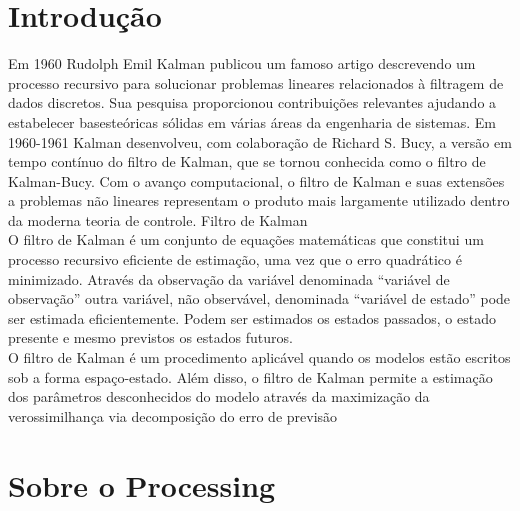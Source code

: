 \documentclass[11pt,a4paper]{article}
\begin{document}
\section{Introdução}
Em  1960  Rudolph  Emil  Kalman  publicou  um  famoso  artigo  descrevendo  um processo recursivo para solucionar problemas lineares relacionados à filtragem de dados discretos. Sua pesquisa proporcionou contribuições relevantes ajudando a estabelecer basesteóricas sólidas em várias áreas da engenharia de sistemas. Em 1960-1961  Kalman  desenvolveu,  com  colaboração de  Richard  S.  Bucy,  a  versão  em tempo contínuo do filtro de Kalman, que se tornou conhecida como o filtro de Kalman-Bucy. Com o avanço computacional, o filtro de Kalman e suas extensões a problemas não lineares representam o produto mais largamente utilizado dentro da moderna teoria de controle. Filtro de Kalman \\
O  filtro  de  Kalman  é  um  conjunto  de  equações  matemáticas que  constitui  um  processo  recursivo  eficiente  de  estimação, uma  vez  que  o  erro  quadrático  é  minimizado.   Através   da   observação   da   variável   denominada   “variável   de   observação”  outra  variável,  não  observável,  denominada  “variável  de  estado”  pode  ser  estimada  eficientemente.  Podem  ser  estimados  os  estados  passados,  o  estado presente e mesmo previstos os estados futuros.\\ 
O  filtro  de  Kalman  é  um  procedimento  aplicável  quando  os  modelos  estão  escritos  sob  a  forma  espaço-estado.  Além  disso,  o  filtro  de  Kalman  permite  a  estimação  dos  parâmetros  desconhecidos  do  modelo  através  da  maximização da verossimilhança via decomposição do erro de previsão
\section{Sobre o Processing}
\end{document}
